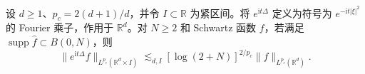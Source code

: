 设 $d\geq1$、$p_c=2(d+1)/d$，并令 $I\subset\mathbb R$ 为紧区间。将 $e^{\mathrm i t\Delta}$ 定义为符号为 $e^{-\mathrm i t|\xi|^2}$ 的 Fourier 乘子，作用于 $\mathbb R^d$。对 $N\geq2$ 和 Schwartz 函数 $f$，若满足 $\operatorname{supp}\widehat f\subset B(0,N)$，则
\[
\|e^{\mathrm i t\Delta}f\|_{L^{p_c}(\mathbb R^d\times I)}
 \lesssim_{d,I}[\log(2+N)]^{2/p_c}\|f\|_{L^{p_c}(\mathbb R^d)}.
\]
